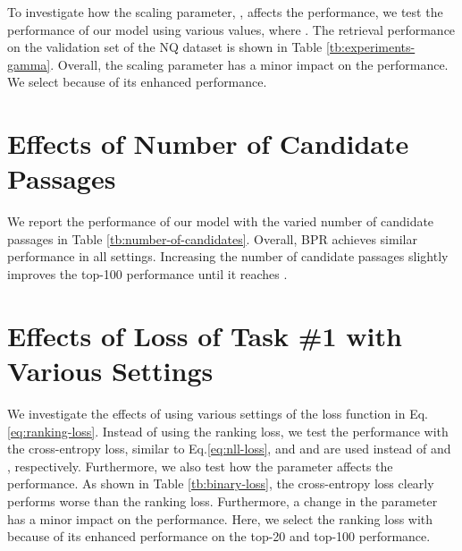 \documentclass[11pt,a4paper]{article}
\begin{document}
To investigate how the scaling parameter, , affects the performance, we test the performance of our model using various  values, where .
The retrieval performance on the validation set of the NQ dataset is shown in Table \ref{tb:experiments-gamma}.
Overall, the scaling parameter has a minor impact on the performance.
We select  because of its enhanced performance.

\section{Effects of Number of Candidate Passages}
\label{sec:effects-num-candidates}

We report the performance of our model with the varied number of candidate passages  in Table \ref{tb:number-of-candidates}.
Overall, BPR achieves similar performance in all settings.
Increasing the number of candidate passages slightly improves the top-100 performance until it reaches .

\section{Effects of Loss of Task \#1 with Various Settings}
\label{sec:effects-binary-loss}

We investigate the effects of using various settings of the loss function  in Eq.\eqref{eq:ranking-loss}.
Instead of using the ranking loss, we test the performance with the cross-entropy loss, similar to Eq.\eqref{eq:nll-loss}, and  and  are used instead of  and , respectively.
Furthermore, we also test how the parameter  affects the performance.
As shown in Table \ref{tb:binary-loss}, the cross-entropy loss clearly performs worse than the ranking loss.
Furthermore, a change in the parameter  has a minor impact on the performance.
Here, we select the ranking loss with  because of its enhanced performance on the top-20 and top-100 performance.
\end{document}
